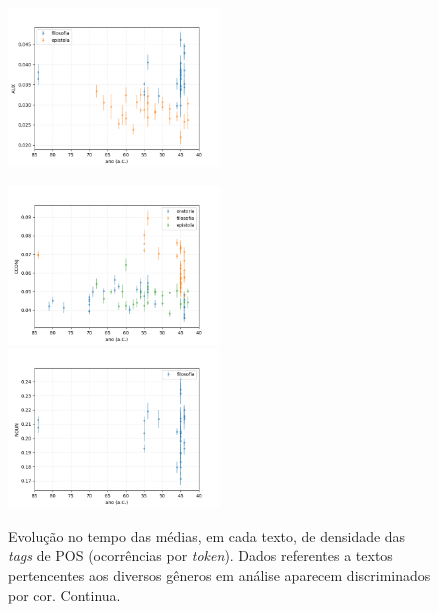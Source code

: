 \documentclass[10pt,a4paper,onecolumn]{article}
\theoremstyle{definition}
\theoremstyle{remark}
\begin{document}
\begin{figure}[htpb!]
\begin{multicols}{2}
		\includegraphics[width=0.5\textwidth]{graficos/AUX_no_tempo.png}  \\
	\end{multicols}\vspace{-0.75cm}
	\begin{multicols}{2}
		\includegraphics[width=0.5\textwidth]{graficos/CCONJ_no_tempo.png}  \\
		\includegraphics[width=0.5\textwidth]{graficos/NOUN_no_tempo.png}  \\
	\end{multicols}
	\caption{Evolução no tempo das médias, em cada texto, de densidade das \emph{tags} de POS (ocorrências por \emph{token}). Dados referentes a textos pertencentes aos diversos gêneros em análise aparecem discriminados por cor. Continua.}
	\label{fig:serie1}
\end{figure}
\end{document}
